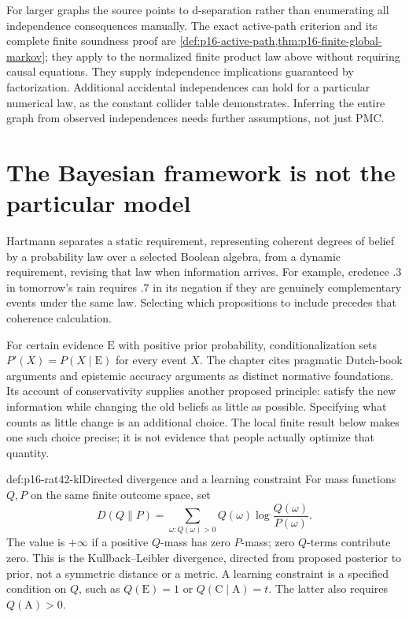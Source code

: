 For larger graphs the source points to d-separation rather than enumerating
all independence consequences manually. The exact active-path criterion
and its complete finite soundness proof are
\cref{def:p16-active-path,thm:p16-finite-global-markov}; they apply to
the normalized finite product law above without requiring causal equations.
They supply independence implications guaranteed by factorization.
Additional accidental independences can hold for a particular numerical
law, as the constant collider table demonstrates. Inferring the entire
graph from observed independences needs further assumptions, not just PMC.

\section{The Bayesian framework is not the particular model}
\label{sec:p16-rat42-framework-and-model}

Hartmann separates a static requirement, representing coherent degrees of
belief by a probability law over a selected Boolean algebra, from a dynamic
requirement, revising that law when information arrives. For example,
credence \(.3\) in tomorrow's rain requires \(.7\) in its negation
if they are genuinely complementary events under the same law. Selecting
which propositions to include precedes that coherence calculation.
\cite[Sec.~3.1, pp.~255--256]{Hartmann2021BayesNets}

For certain evidence \(\mathrm E\) with positive prior probability,
conditionalization sets \(P'(X)=P(X\mid\mathrm E)\) for every event
\(X\). The chapter cites pragmatic Dutch-book arguments and epistemic
accuracy arguments as distinct normative foundations. Its account of
conservativity supplies another proposed principle: satisfy the new
information while changing the old beliefs as little as possible.
Specifying what counts as little change is an additional choice.
The local finite result below makes one such choice precise; it is not
evidence that people actually optimize that quantity.

\begin{hbdefinition}{def:p16-rat42-kl}{Directed divergence and a learning constraint}
For mass functions \(Q,P\) on the same finite outcome space, set
\[
 D(Q\|P)=\sum_{\omega:Q(\omega)>0}
                  Q(\omega)\log\frac{Q(\omega)}{P(\omega)}.
\]
The value is \(+\infty\) if a positive \(Q\)-mass has zero
\(P\)-mass; zero \(Q\)-terms contribute zero. This is the
Kullback--Leibler divergence, directed from proposed posterior to prior,
not a symmetric distance or a metric. A learning constraint is a
specified condition on \(Q\), such as \(Q(\mathrm E)=1\) or
\(Q(\mathrm C\mid\mathrm A)=t\). The latter also requires
\(Q(\mathrm A)>0\).
\end{hbdefinition}

